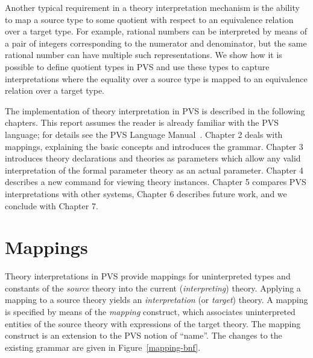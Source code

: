 \documentclass[11pt,twoside,openright,titlepage]{cslreport}
\begin{document}
Another typical requirement in a theory interpretation mechanism is
the ability to map a source type to some quotient with respect to
an equivalence relation over a target type.
For example, rational numbers can be interpreted by means of
a pair of integers corresponding to the numerator and denominator,
but the same rational number can have multiple such representations.
We show how it is possible to define quotient types in PVS and use
these types to capture interpretations where the equality over a
source type is mapped to an equivalence relation over a target type. 

The implementation of theory interpretation in PVS is described in the
following chapters.  This report assumes the reader is already familiar
with the PVS language; for details see the PVS Language
Manual~\cite{PVS:language}.  Chapter 2 deals with mappings, explaining the
basic concepts and introduces the grammar.  Chapter 3 introduces theory
declarations and theories as parameters which allow any valid
interpretation of the formal parameter theory as an actual parameter.
Chapter 4 describes a new command for viewing theory instances.  Chapter 5
compares PVS interpretations with other systems, Chapter 6 describes
future work, and we conclude with Chapter 7.


\chapter{Mappings}\label{mappings}

Theory interpretations in PVS provide mappings for uninterpreted types and
constants of the \emph{source} theory into the current
(\emph{interpreting}) theory.  Applying a mapping to a source theory
yields an \emph{interpretation} (or \emph{target}) theory.  A mapping is
specified by means of the \emph{mapping} construct, which associates
uninterpreted entities of the source theory with expressions of the target
theory.  The mapping construct is an extension to the PVS notion of
``name''.  The changes to the existing grammar are given in
Figure~\ref{mapping-bnf}.
\end{document}
